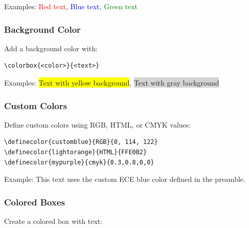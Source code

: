 Examples:
\textcolor{red}{Red text},
\textcolor{blue}{Blue text},
\textcolor{green}{Green text}

\subsubsection{Background Color}\label{subsubsec:background-color}
Add a background color with:
\begin{verbatim}
\colorbox{<color>}{<text>}
\end{verbatim}

Examples:
\colorbox{yellow}{Text with yellow background},
\colorbox{lightgray}{Text with gray background}

\subsubsection{Custom Colors}\label{subsubsec:custom-colors}
Define custom colors using RGB, HTML, or CMYK values:

\begin{verbatim}
\definecolor{customblue}{RGB}{0, 114, 122}
\definecolor{lightorange}{HTML}{FFE0B2}
\definecolor{mypurple}{cmyk}{0.3,0.8,0,0}
\end{verbatim}

Example: \textcolor{\bleuece}{This text uses the custom ECE blue color} defined in the preamble.

\subsubsection{Colored Boxes}\label{subsubsec:colored-boxes}
Create a colored box with text:

\begin{center}
\end{center}
